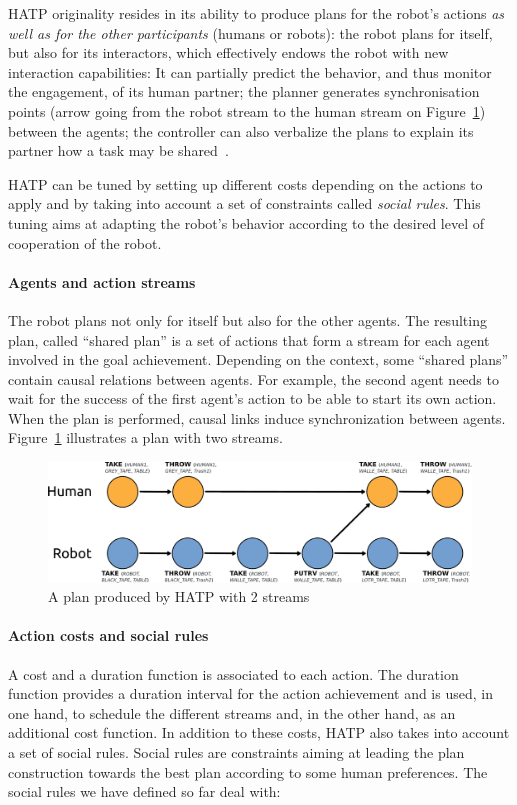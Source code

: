 \documentclass[preprint,3p,times]{elsarticle}
\begin{document}
HATP originality resides in its ability to produce plans for the robot's
actions \emph{as well as for the other participants} (humans or robots): the
robot plans for itself, but also for its interactors, which effectively endows the robot
with new interaction capabilities: It can partially predict the behavior, and
thus monitor the engagement, of its human partner; the planner generates
synchronisation points (arrow going from the robot stream to the human stream on
Figure~\ref{plan_hatp1}) between the agents; the controller can also verbalize
the plans to explain its partner how a task may be shared~\cite{warnier2012when}.

HATP can be tuned by setting up different costs depending on the actions to
apply and by taking into account a set of constraints called \emph{social
rules}. This tuning aims at adapting the robot's behavior according to the
desired level of cooperation of the robot.

\paragraph{Agents and action streams}
The robot plans not only for itself but also for the other agents. The
resulting plan, called ``shared plan'' is a set of actions that form
a stream for each agent involved in the goal achievement. Depending on
the context, some ``shared plans'' contain causal relations between
agents. For example, the second agent needs to wait for the success of
the first agent's action to be able to start its own action. When the
plan is performed, causal links induce synchronization between
agents. Figure~\ref{plan_hatp1} illustrates a plan with two streams.

\begin{figure}[htbp]
  \centering
  \includegraphics[width=0.95\columnwidth]{first_plan.pdf}
  \caption{A plan produced by HATP with 2 streams}
  \label{plan_hatp1}
\end{figure}

\paragraph{Action costs and social rules}
A cost and a duration function is associated to each action.
The duration function provides a duration interval for the action
achievement and is used, in one hand, to schedule the different
streams and, in the other hand, as an additional cost function.
In addition to these costs, HATP also takes into account a set of social
rules.  Social rules are constraints aiming at leading the plan
construction towards the best plan according to some human
preferences. The social rules we have defined so far deal with:
\end{document}
